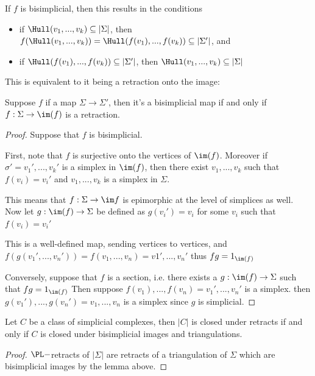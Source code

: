 If $f$ is bisimplicial, then this results in the conditions
\begin{itemize}
    \item if $\Hull(v_1,...,v_k)\subseteq |\Sigma|$, then $f(\Hull(v_1,...,v_k))=\Hull(f(v_1),...,f(v_k))\subseteq |\Sigma'|$, and 
    \item if $\Hull(f(v_1),...,f(v_k))\subseteq |\Sigma'|$, then $\Hull(v_1,...,v_k)\subseteq |\Sigma|$
\end{itemize} 

This is equivalent to it being a retraction onto the image:
\begin{theorem}\hfill

    Suppose $f$ if a map $\Sigma\to\Sigma'$, then it's a bisimplicial map if and only if $f:\Sigma\to\im(f)$ is a retraction.
\end{theorem}
\begin{proof}\hfill 

    Suppose that $f$ is bisimplicial.

    First, note that $f$ is surjective onto the vertices of $\im(f)$. 
    Moreover if $\sigma'=v_1',...,v_k'$ is a simplex in $\im(f)$, then there exist $v_1,...,v_k$ such that $f(v_i)=v_i'$ and $v_1,...,v_k$ is a simplex in $\Sigma$.

    This means that $f:\Sigma\to\im f$ is epimorphic at the level of simplices as well. 
    Now let $g:\im(f)\to \Sigma$ be defined as $g(v_i')=v_i$ for some $v_i$ such that $f(v_i)=v_i'$

    This is a well-defined map, sending vertices to vertices, and $f(g(v_1',...,v_n'))=f(v_1,...,v_n)=v1',...,v_n'$ thus $fg=1_{\im(f)}$

    Conversely, suppose that $f$ is a section, i.e. there exists a $g:\im(f)\to \Sigma$ such that $fg=1_{\im(f)}$
    Then suppose $f(v_1),...,f(v_n)=v_1',...,v_n'$ is a simplex. then $g(v_1'),...,g(v_n')=v_1,...,v_n$ is a simplex since $g$ is simplicial.
\end{proof}

\begin{corollary}
    Let $C$ be a class of simplicial complexes, then $|C|$ is closed under retracts if and only if $C$ is closed under bisimplicial images and triangulations. 
\end{corollary}
\begin{proof}
    $\PL-$retracts of $|\Sigma|$ are retracts of a triangulation of $\Sigma$ which are bisimplicial images by the lemma above.
\end{proof}

